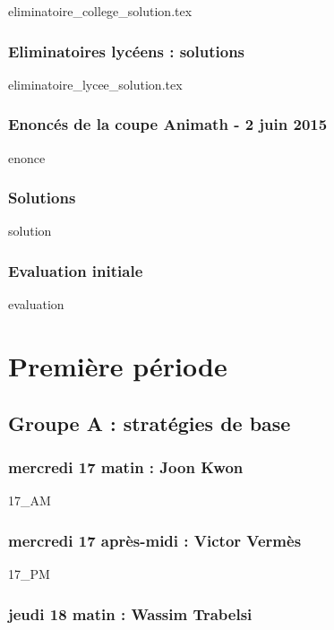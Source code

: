 \documentclass[12pt,A4]{book}
\theoremstyle{definition}
\theoremstyle{thm}
\theoremstyle{def}
\newcounter{sol}[subsection]
\begin{document}
{eliminatoire_college_solution.tex}

\subsection{Eliminatoires lycéens : solutions}

{eliminatoire_lycee_solution.tex}

\subsection {Enoncés de la coupe Animath - 2 juin 2015}

{enonce}

\subsection{Solutions}

{solution}

\subsection{Evaluation initiale}

{evaluation}




\chapter{Première période}
\minitoc \bigskip




\section {Groupe A : stratégies de base}

\subsection{mercredi 17 matin : Joon Kwon}

{17_AM}

\subsection{mercredi 17 après-midi : Victor Vermès}

{17_PM}

\subsection{jeudi 18 matin : Wassim Trabelsi}
\end{document}
